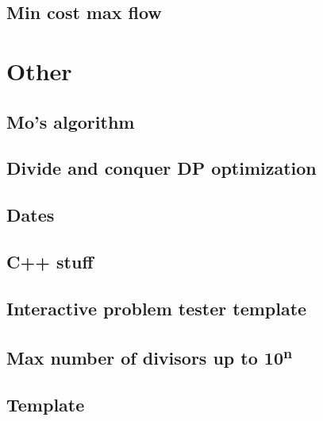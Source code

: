 \subsection{Min cost max flow}

\section{Other}
\subsection{Mo's algorithm}
\subsection{Divide and conquer DP optimization}
\subsection{Dates}
\subsection{C++ stuff}
\subsection{Interactive problem tester template}
\subsection{Max number of divisors up to 10\textsuperscript{n}}
\subsection{Template}



